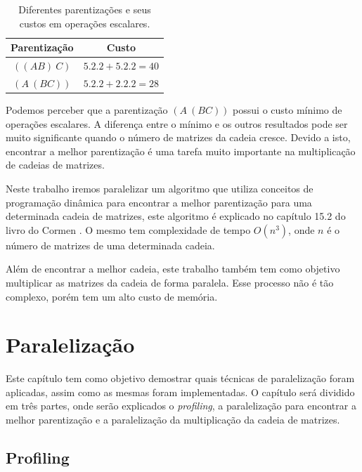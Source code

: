 \documentclass[12pt,openright,oneside,chapter=TITLE,section=TITLE,
    brazil]{utfpr-pg}
\begin{document}
\begin{table}[h]	
	\centering	
	\begin{tabular}{|c|c|} \hline
		\textbf{Parentização} & \textbf{Custo}      \\ \hline
		$((A B) \ C)$             & $5.2.2 + 5.2.2 = 40$  \\ \hline
		$(A \ (B C))$             & $5.2.2 + 2.2.2 = 28$  \\ \hline
	\end{tabular}

	\caption{Diferentes parentizações e seus custos em operações escalares.}
	\vspace{-0.35cm}
	\label{tab:mult}
\end{table}

Podemos perceber que a parentização $(A \ (B C))$ possui o custo mínimo de operações escalares. A diferença entre o mínimo e os outros resultados pode ser muito significante quando o número de matrizes da cadeia cresce. Devido a isto, encontrar a melhor parentização é uma tarefa muito importante na multiplicação de cadeias de matrizes. 

Neste trabalho iremos paralelizar um algoritmo que utiliza conceitos de programação dinâmica para encontrar a melhor parentização para uma determinada cadeia de matrizes, este algoritmo é explicado no capítulo 15.2 do livro do Cormen \cite{cormen2009introduction}. O mesmo tem complexidade de tempo $O(n^3)$, onde $n$ é o número de matrizes de uma determinada cadeia. 

Além de encontrar a melhor cadeia, este trabalho também tem como objetivo multiplicar as matrizes da cadeia de forma paralela. Esse processo não é tão complexo, porém tem um alto custo de memória.

\vspace{1cm}
{\let\clearpage\relax \chapter{Paralelização}}
\vspace{-0.7cm}

Este capítulo tem como objetivo demostrar quais técnicas de paralelização foram aplicadas, assim como as mesmas foram implementadas. O capítulo será dividido em três partes, onde serão explicados o \emph{profiling}, a paralelização para encontrar a melhor parentização e a paralelização da multiplicação da cadeia de matrizes.

\vspace{0.5cm}
\section{Profiling}
\vspace{-0.7cm}
\end{document}
